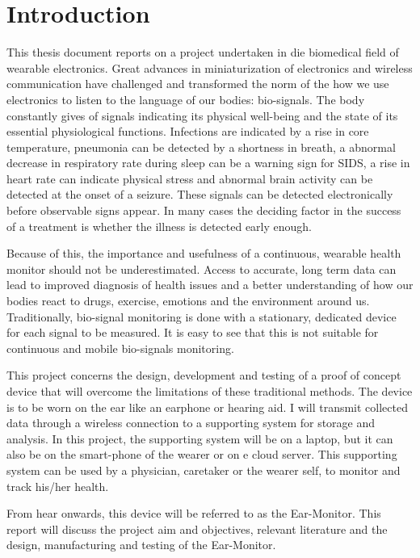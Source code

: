 \chapter{Introduction}
\label{chp:Intro}
This thesis document reports on a project undertaken in die biomedical field of wearable electronics. Great advances in miniaturization of electronics and wireless communication have challenged and transformed the norm of the how we use electronics to listen to the language of our bodies: bio-signals. The body constantly gives of signals indicating its physical well-being and the state of its essential physiological functions. Infections are indicated by a rise in core temperature, pneumonia can be detected by a shortness in breath, a abnormal decrease in respiratory rate during sleep can be a warning sign for SIDS, a rise in heart rate can indicate physical stress and abnormal brain activity can be detected at the onset of a seizure. These signals can be detected electronically before observable signs appear. In many cases the deciding factor in the success of a treatment is whether the illness is detected early enough.

\medskip

Because of this, the importance and usefulness of a continuous, wearable health monitor should not be underestimated. Access to accurate, long term data can lead to improved diagnosis of health issues and a better understanding of how our bodies react to drugs, exercise, emotions and the environment around us. Traditionally, bio-signal monitoring is done with a stationary, dedicated device for each signal to be measured. It is easy to see that this is not suitable for continuous and mobile bio-signals monitoring. 

\medskip

This project concerns the design, development and testing of a proof of concept device that will overcome the limitations of these traditional methods. The device is to be worn on the ear like an earphone or hearing aid. I will transmit collected data through a wireless connection to a supporting system for storage and analysis. In this project, the supporting system will be on a laptop, but it can also be on the smart-phone of the wearer or on e cloud server. This supporting system can be used by a physician, caretaker or the wearer self, to monitor and track his/her health.

\medskip

From hear onwards, this device will be referred to as the Ear-Monitor. This report will discuss the project aim and objectives, relevant literature and the design, manufacturing and testing of the Ear-Monitor.

